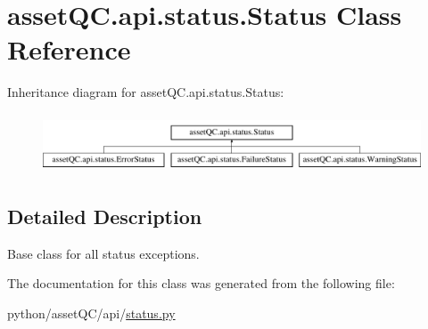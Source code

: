 \hypertarget{classassetQC_1_1api_1_1status_1_1Status}{\section{asset\-Q\-C.\-api.\-status.\-Status \-Class \-Reference}
\label{db/d74/classassetQC_1_1api_1_1status_1_1Status}
}
\-Inheritance diagram for asset\-Q\-C.\-api.\-status.\-Status\-:\begin{figure}[H]
\begin{center}
\leavevmode
\includegraphics[height=1.777778cm]{db/d74/classassetQC_1_1api_1_1status_1_1Status}
\end{center}
\end{figure}


\subsection{\-Detailed \-Description}
\begin{DoxyVerb}
Base class for all status exceptions.
\end{DoxyVerb}
 

\-The documentation for this class was generated from the following file\-:\begin{DoxyCompactItemize}
\item 
python/asset\-Q\-C/api/\hyperlink{status_8py}{status.\-py}\end{DoxyCompactItemize}
